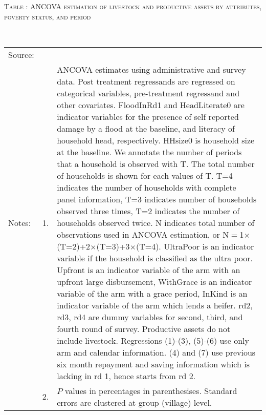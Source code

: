 \hspace{-1cm}\begin{minipage}[t]{14cm}
\hfil\textsc{\normalsize Table \thetable: ANCOVA estimation of livestock and productive assets by attributes, poverty status, and period\label{tab ANCOVA productive assets timevarying poverty status attributes}}\\
\setlength{\tabcolsep}{1pt}
\setlength{\baselineskip}{8pt}
\renewcommand{\arraystretch}{.55}
\hfil{}\\
\renewcommand{\arraystretch}{.8}
\setlength{\tabcolsep}{1pt}
\begin{tabular}{>{\hfill\scriptsize}p{1cm}<{}>{\hfill\scriptsize}p{.25cm}<{}>{\scriptsize}p{12cm}<{\hfill}}
Source:& \multicolumn{2}{l}{\scriptsize Estimated with GUK administrative and survey data.}\\
Notes: & 1. & ANCOVA estimates using administrative and survey data. Post treatment regressands are regressed on categorical variables, pre-treatment regressand and other covariates. \textsf{FloodInRd1} and \textsf{HeadLiterate0} are indicator variables for the presence of self reported damage by a flood at the baseline, and literacy of household head, respectively. \textsf{HHsize0} is household size at the baseline. We annotate the number of periods that a household is observed with \textsf{T}. The total number of households is shown for each values of \textsf{T}. \textsf{T=4} indicates the number of households with complete panel information, \textsf{T=3} indicates number of households observed three times, \textsf{T=2} indicates the number of households observed twice. \textsf{N} indicates total number of observations used in ANCOVA estimation, or \textsf{N$=$1$\times$(T=2)+2$\times$(T=3)+3$\times$(T=4)}.  \textsf{UltraPoor} is an indicator variable if the household is classified as the ultra poor. \textsf{Upfront} is an indicator variable of the arm with an upfront large disbursement, \textsf{WithGrace} is an indicator variable of the arm with a grace period, \textsf{InKind} is an indicator variable of the arm which lends a heifer. \textsf{rd2, rd3, rd4} are dummy variables for second, third, and fourth round of survey. Productive assets do not include livestock. Regressions (1)-(3), (5)-(6) use only arm and calendar information. (4) and (7) use previous six month repayment and saving information which is lacking in rd 1, hence starts from rd 2.\\
& 2. & $P$ values in percentages in parenthesises. Standard errors are clustered at group (village) level.
\end{tabular}
\end{minipage}


